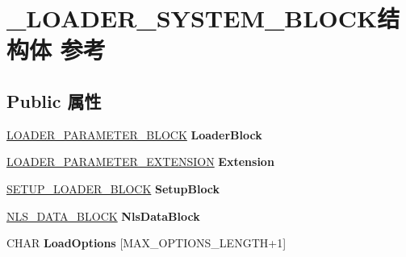 \hypertarget{struct___l_o_a_d_e_r___s_y_s_t_e_m___b_l_o_c_k}{}\section{\+\_\+\+L\+O\+A\+D\+E\+R\+\_\+\+S\+Y\+S\+T\+E\+M\+\_\+\+B\+L\+O\+C\+K结构体 参考}
\label{struct___l_o_a_d_e_r___s_y_s_t_e_m___b_l_o_c_k}
\subsection*{Public 属性}
\begin{DoxyCompactItemize}
\item 
\mbox{\label{struct___l_o_a_d_e_r___s_y_s_t_e_m___b_l_o_c_k_aaee9eec9f520de7c71e44f32664da7fb}} 
\hyperlink{struct___l_o_a_d_e_r___p_a_r_a_m_e_t_e_r___b_l_o_c_k}{L\+O\+A\+D\+E\+R\+\_\+\+P\+A\+R\+A\+M\+E\+T\+E\+R\+\_\+\+B\+L\+O\+CK} {\bfseries Loader\+Block}
\item 
\mbox{\label{struct___l_o_a_d_e_r___s_y_s_t_e_m___b_l_o_c_k_a9391d572b383d9395c33e018af3e9f4e}} 
\hyperlink{struct___l_o_a_d_e_r___p_a_r_a_m_e_t_e_r___e_x_t_e_n_s_i_o_n}{L\+O\+A\+D\+E\+R\+\_\+\+P\+A\+R\+A\+M\+E\+T\+E\+R\+\_\+\+E\+X\+T\+E\+N\+S\+I\+ON} {\bfseries Extension}
\item 
\mbox{\label{struct___l_o_a_d_e_r___s_y_s_t_e_m___b_l_o_c_k_ade3fc02236bd8ea604ad1b5159bf1129}} 
\hyperlink{struct___s_e_t_u_p___l_o_a_d_e_r___b_l_o_c_k}{S\+E\+T\+U\+P\+\_\+\+L\+O\+A\+D\+E\+R\+\_\+\+B\+L\+O\+CK} {\bfseries Setup\+Block}
\item 
\mbox{\label{struct___l_o_a_d_e_r___s_y_s_t_e_m___b_l_o_c_k_a8f792fe9864a732b04a580b4349ee228}} 
\hyperlink{struct___n_l_s___d_a_t_a___b_l_o_c_k}{N\+L\+S\+\_\+\+D\+A\+T\+A\+\_\+\+B\+L\+O\+CK} {\bfseries Nls\+Data\+Block}
\item 
\mbox{\label{struct___l_o_a_d_e_r___s_y_s_t_e_m___b_l_o_c_k_add885c712441e33d9d6078ae3549e2b6}} 
C\+H\+AR {\bfseries Load\+Options} \mbox{[}M\+A\+X\+\_\+\+O\+P\+T\+I\+O\+N\+S\+\_\+\+L\+E\+N\+G\+TH+1\mbox{]}

\end{DoxyCompactItemize}
